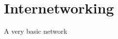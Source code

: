 \section{Internetworking}
\label{sec:internetworking}



\begin{frame}{A very basic network}
\end{frame}